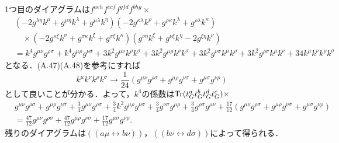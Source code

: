 1つ目のダイアグラムは$f^{aeh}f^{ecf}f^{gfd}f^{bhg}\times$
\begin{align*}
  & \left( - 2 g^{\lambda\eta} k^{\mu} + g^{\mu\eta} k^{\lambda} + g^{\mu\lambda} k^{\eta} \right)
  \left( - 2 g^{\kappa\lambda} k^{\rho} + g^{\rho\kappa} k^{\lambda} + g^{\rho\lambda} k^{\kappa} \right) \\
  &\quad\times \left( - 2 g^{\kappa\xi} k^{\sigma} + g^{\sigma\kappa} k^{\xi} + g^{\sigma\xi} k^{\kappa} \right)
  \left( g^{\nu\eta} k^{\xi} + g^{\nu\xi} k^{\eta} - 2 g^{\xi\eta} k^{\nu} \right) \\
  &= k^4 g^{\mu\nu} g^{\rho\sigma} + k^4 g^{\mu\rho} g^{\nu\sigma}
  + 3 k^2 g^{\mu\nu} k^{\rho} k^{\sigma} + 3 k^2 g^{\mu\rho} k^{\nu} k^{\sigma}
  + 3 k^2 g^{\nu\sigma} k^{\mu} k^{\rho} + 3 k^2 g^{\rho\sigma} k^{\mu} k^{\nu}
  + 34 k^{\mu} k^{\nu} k^{\rho} k^{\sigma}
\end{align*}
となる．(A.47)(A.48)を参考にすれば
\[ k^{\mu} k^{\nu} k^{\rho} k^{\sigma} \to \frac{1}{24} (g^{\mu\nu} g^{\rho\sigma} + g^{\mu\rho} g^{\nu\sigma} + g^{\mu\sigma} g^{\nu\rho}) \]
として良いことが分かる．よって，$k^4$の係数は$\operatorname{Tr}(t_G^a t_G^b t_G^d t_G^c) \times$
\begin{align*}
  & g^{\mu\nu} g^{\rho\sigma} + g^{\mu\rho} g^{\nu\sigma}
  + \frac{3}{4} g^{\mu\nu} g^{\rho\sigma} + \frac{3}{4} k^2 g^{\mu\rho} g^{\nu\sigma}
  + \frac{3}{4} g^{\nu\sigma} g^{\mu\rho} + \frac{3}{4}  g^{\rho\sigma} g^{\mu\nu}
  + \frac{17}{12} (g^{\mu\nu} g^{\rho\sigma} + g^{\mu\rho} g^{\nu\sigma} + g^{\mu\sigma} g^{\nu\rho}) \\
  &= \frac{47}{12} g^{\mu\nu} g^{\rho\sigma} + \frac{47}{12} g^{\mu\rho} g^{\nu\sigma}
  + \frac{17}{12} g^{\mu\sigma} g^{\nu\rho} .
\end{align*}
残りのダイアグラムは$(\!(a\mu\leftrightarrow b\nu)\!)$，$(\!(b\nu\leftrightarrow d\sigma)\!)$によって得られる．
